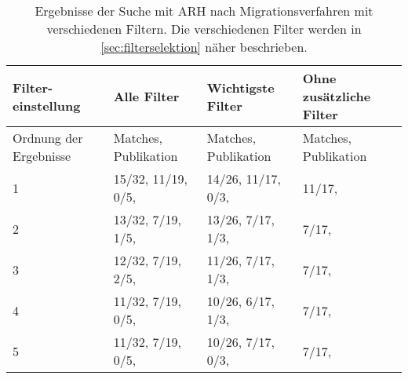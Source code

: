 \begin{table}[!h]
  \centering
  \begin{tabular}{m{2cm} m{4.3cm} m{4.3cm} m{2.5cm}}
    \toprule
    \textbf{Filter-einstellung} & \textbf{Alle Filter} & \textbf{Wichtigste Filter} & \textbf{Ohne zusätzliche Filter} \\ \hline
    Ordnung der Ergebnisse & Matches, Publikation & Matches, Publikation & Matches, Publikation \\ \midrule
    1 & 15/32, 11/19, 0/5, \cite{arh-result-no-filter-1} & 14/26, 11/17, 0/3, \cite{arh-result-no-filter-1} & 11/17, \cite{arh-result-no-filter-1}  \\ \hline
    2 & 13/32, 7/19, 1/5, \cite{arh-result-no-filter-3} & 13/26, 7/17, 1/3, \cite{arh-result-no-filter-3} & 7/17, \cite{arh-result-no-filter-2} \\ \hline
    3 & 12/32, 7/19, 2/5, \cite{arh-result-no-filter-2} & 11/26, 7/17, 1/3,  \cite{arh-result-no-filter-2} & 7/17, \cite{arh-result-no-filter-3} \\ \hline
    4 & 11/32, 7/19, 0/5, \cite{arh-result-no-filter-4} & 10/26, 6/17, 1/3, \cite{arh-result-important-filter-4} &  7/17, \cite{arh-result-no-filter-4} \\ \hline
    5 & 11/32, 7/19, 0/5, \cite{arh-result-no-filter-5} & 10/26, 7/17, 0/3, \cite{arh-result-no-filter-4} &  7/17, \cite{arh-result-no-filter-5} \\
    \bottomrule
  \end{tabular}
  \caption[Surchergebnisse des ARH von Migrationsverfahren mit verschiedenen Filtern]{
    Ergebnisse der Suche mit ARH nach Migrationsverfahren mit verschiedenen Filtern.
    Die verschiedenen Filter werden in \cref{sec:filterselektion} näher beschrieben.
  }
  \label{tab:phase2-filter-results}
\end{table}
